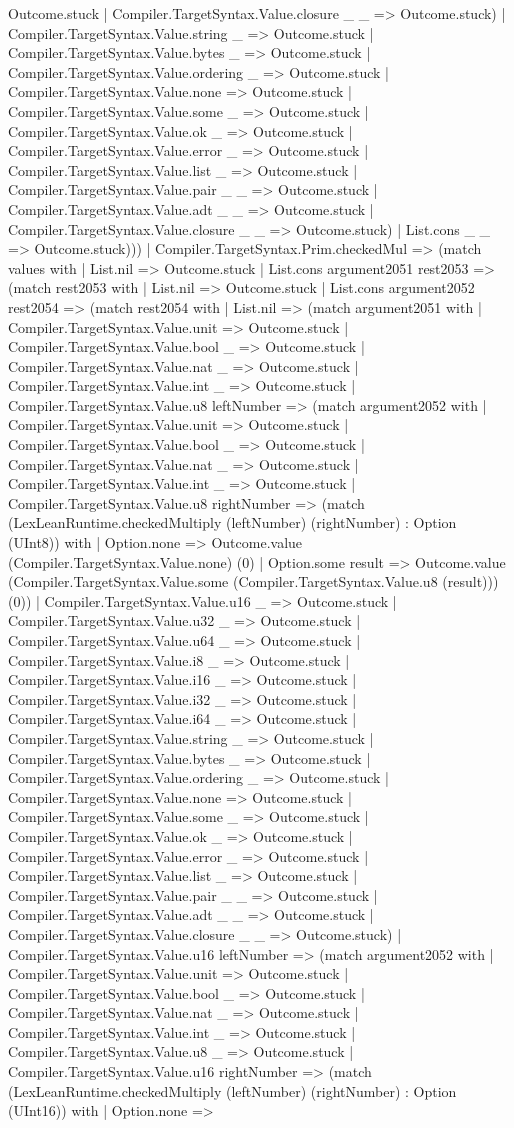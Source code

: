 \documentclass[11pt]{article}
\begin{document}
Outcome.stuck | Compiler.TargetSyntax.Value.closure \_ \_ => Outcome.stuck) | Compiler.TargetSyntax.Value.string \_ => Outcome.stuck | Compiler.TargetSyntax.Value.bytes \_ => Outcome.stuck | Compiler.TargetSyntax.Value.ordering \_ => Outcome.stuck | Compiler.TargetSyntax.Value.none => Outcome.stuck | Compiler.TargetSyntax.Value.some \_ => Outcome.stuck | Compiler.TargetSyntax.Value.ok \_ => Outcome.stuck | Compiler.TargetSyntax.Value.error \_ => Outcome.stuck | Compiler.TargetSyntax.Value.list \_ => Outcome.stuck | Compiler.TargetSyntax.Value.pair \_ \_ => Outcome.stuck | Compiler.TargetSyntax.Value.adt \_ \_ => Outcome.stuck | Compiler.TargetSyntax.Value.closure \_ \_ => Outcome.stuck) | List.cons \_ \_ => Outcome.stuck))) | Compiler.TargetSyntax.Prim.checkedMul => (match values with | List.nil => Outcome.stuck | List.cons argument2051 rest2053 => (match rest2053 with | List.nil => Outcome.stuck | List.cons argument2052 rest2054 => (match rest2054 with | List.nil => (match argument2051 with | Compiler.TargetSyntax.Value.unit => Outcome.stuck | Compiler.TargetSyntax.Value.bool \_ => Outcome.stuck | Compiler.TargetSyntax.Value.nat \_ => Outcome.stuck | Compiler.TargetSyntax.Value.int \_ => Outcome.stuck | Compiler.TargetSyntax.Value.u8 leftNumber => (match argument2052 with | Compiler.TargetSyntax.Value.unit => Outcome.stuck | Compiler.TargetSyntax.Value.bool \_ => Outcome.stuck | Compiler.TargetSyntax.Value.nat \_ => Outcome.stuck | Compiler.TargetSyntax.Value.int \_ => Outcome.stuck | Compiler.TargetSyntax.Value.u8 rightNumber => (match (LexLeanRuntime.checkedMultiply (leftNumber) (rightNumber) : Option (UInt8)) with | Option.none => Outcome.value (Compiler.TargetSyntax.Value.none) (0) | Option.some result => Outcome.value (Compiler.TargetSyntax.Value.some (Compiler.TargetSyntax.Value.u8 (result))) (0)) | Compiler.TargetSyntax.Value.u16 \_ => Outcome.stuck | Compiler.TargetSyntax.Value.u32 \_ => Outcome.stuck | Compiler.TargetSyntax.Value.u64 \_ => Outcome.stuck | Compiler.TargetSyntax.Value.i8 \_ => Outcome.stuck | Compiler.TargetSyntax.Value.i16 \_ => Outcome.stuck | Compiler.TargetSyntax.Value.i32 \_ => Outcome.stuck | Compiler.TargetSyntax.Value.i64 \_ => Outcome.stuck | Compiler.TargetSyntax.Value.string \_ => Outcome.stuck | Compiler.TargetSyntax.Value.bytes \_ => Outcome.stuck | Compiler.TargetSyntax.Value.ordering \_ => Outcome.stuck | Compiler.TargetSyntax.Value.none => Outcome.stuck | Compiler.TargetSyntax.Value.some \_ => Outcome.stuck | Compiler.TargetSyntax.Value.ok \_ => Outcome.stuck | Compiler.TargetSyntax.Value.error \_ => Outcome.stuck | Compiler.TargetSyntax.Value.list \_ => Outcome.stuck | Compiler.TargetSyntax.Value.pair \_ \_ => Outcome.stuck | Compiler.TargetSyntax.Value.adt \_ \_ => Outcome.stuck | Compiler.TargetSyntax.Value.closure \_ \_ => Outcome.stuck) | Compiler.TargetSyntax.Value.u16 leftNumber => (match argument2052 with | Compiler.TargetSyntax.Value.unit => Outcome.stuck | Compiler.TargetSyntax.Value.bool \_ => Outcome.stuck | Compiler.TargetSyntax.Value.nat \_ => Outcome.stuck | Compiler.TargetSyntax.Value.int \_ => Outcome.stuck | Compiler.TargetSyntax.Value.u8 \_ => Outcome.stuck | Compiler.TargetSyntax.Value.u16 rightNumber => (match (LexLeanRuntime.checkedMultiply (leftNumber) (rightNumber) : Option (UInt16)) with | Option.none => 
\end{document}
